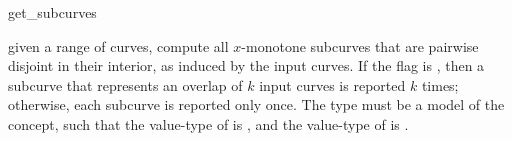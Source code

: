 \ccRefPageBegin

\begin{ccRefFunction}{get_subcurves}


{given a range of curves, compute all $x$-monotone subcurves that are pairwise
 disjoint in their interior, as induced by the input curves.
 If the flag  is , then a subcurve that
 represents an overlap of $k$ input curves is reported $k$ times; otherwise,
 each subcurve is reported only once. The  type must be a model
 of the  concept, such that the value-type of
  is , and the value-type of
  is .}

\end{ccRefFunction}

\ccRefPageEnd

